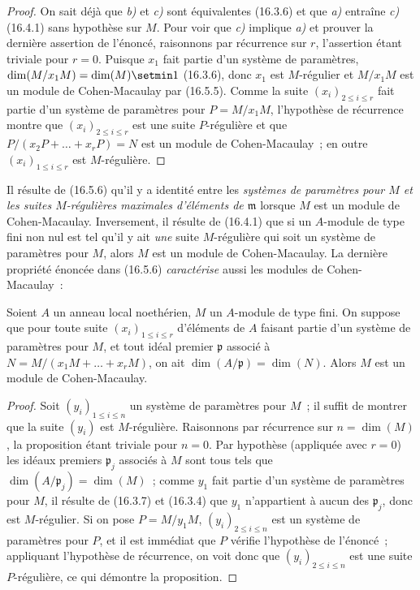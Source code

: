 \begin{proof}
On sait déjà que \emph{b)} et \emph{c)} sont équivalentes (16.3.6) et que \emph{a)} entraîne \emph{c)}
(16.4.1) sans hypothèse sur $M$. Pour voir que \emph{c)} implique \emph{a)} et prouver la
dernière assertion de l'énoncé, raisonnons par récurrence sur $r$, l'assertion
étant triviale pour $r=0$. Puisque $x_1$ fait partie d'un système de
paramètres, $\dim(M/x_1M)=\dim(M)\setmin 1$ (16.3.6), donc $x_1$ est $M$-régulier et
$M/x_1M$ est un module de Cohen-Macaulay par (16.5.5). Comme la suite
$(x_i)_{2\leq i\leq r}$ fait partie d'un système de paramètres pour
$P=M/x_1M$, l'hypothèse de récurrence montre que $(x_i)_{2\leq i\leq r}$ est
une suite $P$-régulière et que
$P/(x_2P+\ldots+x_rP)=N$ est un module de Cohen-Macaulay~; en outre
$(x_i)_{1\leq i\leq r}$ est $M$-régulière.
\end{proof}

\begin{remark}[16.5.7]
\label{0.16.5.7-fr}
Il résulte de (16.5.6) qu'il y a identité entre les \emph{systèmes de
paramètres pour $M$ et les suites $M$-régulières maximales d'éléments de
$\mathfrak{m}$} lorsque $M$ est un module de Cohen-Macaulay. Inversement, il
résulte de (16.4.1) que si un $A$-module de type fini non nul est tel qu'il y
ait \emph{une} suite $M$-régulière qui soit un système de paramètres pour $M$, alors
$M$ est un module de Cohen-Macaulay. La dernière propriété énoncée dans
(16.5.6) \emph{caractérise} aussi les modules de Cohen-Macaulay~:
\end{remark}

\begin{proposition}[16.5.8]
\label{0.16.5.8-fr}
Soient $A$ un anneau local noethérien, $M$ un $A$-module de type fini. On
suppose que pour toute suite $(x_i)_{1\leq i\leq r}$ d'éléments de $A$
faisant partie d'un système de paramètres pour $M$, et tout idéal premier
$\mathfrak{p}$ associé à
$N=M/(x_1M+\ldots+x_rM)$, on ait
$\dim(A/\mathfrak{p})=\dim(N)$. Alors $M$ est un module de Cohen-Macaulay.
\end{proposition}

\begin{proof}
Soit $(y_i)_{1\leq i\leq n}$ un système de paramètres pour $M$~; il suffit de
montrer que la suite $(y_i)$ est $M$-régulière. Raisonnons par récurrence sur
$n=\dim(M)$, la proposition étant triviale pour $n=0$. Par hypothèse
(appliquée avec $r=0$) les idéaux premiers $\mathfrak{p}_j$ associés à $M$
sont tous tels que $\dim(A/\mathfrak{p}_j)=\dim(M)$~; comme $y_1$ fait partie
d'un système de paramètres
pour $M$, il résulte de (16.3.7) et (16.3.4) que $y_1$ n'appartient à aucun
des $\mathfrak{p}_j$, donc est $M$-régulier. Si on pose $P=M/y_1M$,
$(y_i)_{2\leq i\leq n}$ est un système de paramètres pour $P$, et il est
immédiat que $P$ vérifie l'hypothèse de l'énoncé~; appliquant l'hypothèse de
récurrence, on voit donc que $(y_i)_{2\leq i\leq n}$ est une suite
$P$-régulière, ce qui démontre la proposition.
\end{proof}

